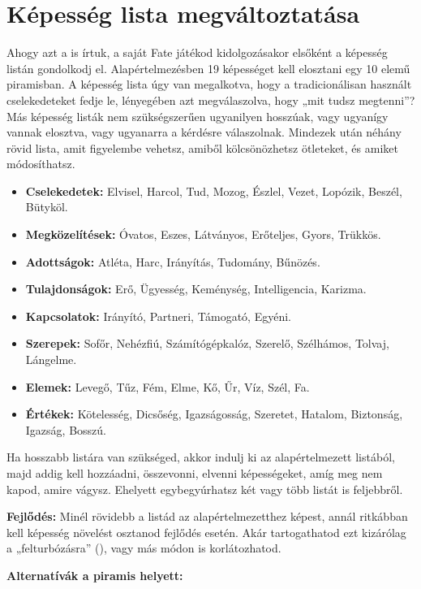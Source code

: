 \section{Képesség lista megváltoztatása}

Ahogy azt a  is írtuk, a saját Fate játékod kidolgozásakor elsőként a képesség listán gondolkodj el. Alapértelmezésben 19 képességet kell elosztani egy 10 elemű piramisban. A képesség lista úgy van megalkotva, hogy a tradicionálisan használt cselekedeteket fedje le, lényegében azt megválaszolva, hogy „mit tudsz megtenni”? Más képesség listák nem szükségszerűen ugyanilyen hosszúak, vagy ugyanígy vannak elosztva, vagy ugyanarra a kérdésre válaszolnak. Mindezek után néhány rövid lista, amit figyelembe vehetsz, amiből kölcsönözhetsz ötleteket, és amiket módosíthatsz.

\begin{itemize}
    \item \textbf{Cselekedetek:} Elvisel, Harcol, Tud, Mozog, Észlel, Vezet, Lopózik, Beszél, Bütyköl.
    \item \textbf{Megközelítések:} Óvatos, Eszes, Látványos, Erőteljes, Gyors, Trükkös.
    \item \textbf{Adottságok:} Atléta, Harc, Irányítás, Tudomány, Bűnözés.
    \item \textbf{Tulajdonságok:} Erő, Ügyesség, Keménység, Intelligencia, Karizma.
    \item \textbf{Kapcsolatok:} Irányító, Partneri, Támogató, Egyéni.
    \item \textbf{Szerepek:} Sofőr, Nehézfiú, Számítógépkalóz, Szerelő, Szélhámos, Tolvaj, Lángelme.
    \item \textbf{Elemek:} Levegő, Tűz, Fém, Elme, Kő, Űr, Víz, Szél, Fa.
    \item \textbf{Értékek:} Kötelesség, Dicsőség, Igazságosság, Szeretet, Hatalom, Biztonság, Igazság, Bosszú.
\end{itemize}

Ha hosszabb listára van szükséged, akkor indulj ki az alapértelmezett listából, majd addig kell hozzáadni, összevonni, elvenni képességeket, amíg meg nem kapod, amire vágysz. Ehelyett egybegyúrhatsz két vagy több listát is feljebbről.

\textbf{Fejlődés:} Minél rövidebb a listád az alapértelmezetthez képest, annál ritkábban kell képesség növelést osztanod fejlődés esetén. Akár tartogathatod ezt kizárólag a „felturbózásra” (), vagy más módon is korlátozhatod.

\textbf{Alternatívák a piramis helyett:}

